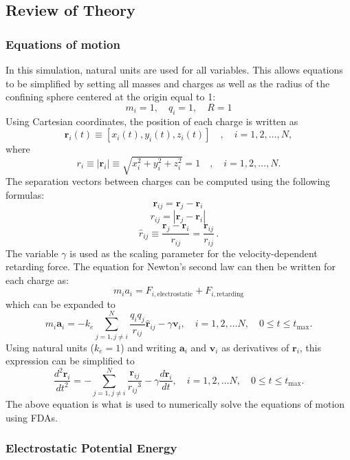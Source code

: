 \documentclass[10pt]{article}
\begin{document}
\subsection*{Review of Theory}

\subsubsection*{Equations of motion}

In this simulation, natural units are used for all variables. This allows equations to be simplified by
setting all masses and charges as well as the radius of the confining sphere centered at the origin
equal to 1: 
$$m_i = 1, \quad q_i = 1, \quad R = 1$$
Using Cartesian coordinates, the position of each charge is written as 
$$\mathbf{r}_i(t) \equiv [x_i(t), y_i(t), z_i(t)] \quad , \quad i = 1, 2, \dots, N,$$
where
$$r_i \equiv |\mathbf{r}_i| \equiv \sqrt{x_i^2 + y_i^2 + z_i^2} = 1 \quad , \quad i = 1, 2, \dots, N.$$
The separation vectors between charges can be computed using the following formulas:
$$\mathbf{r}_{ij} = \mathbf{r}_j - \mathbf{r}_i \,$$
$$r_{ij} = |\mathbf{r}_j - \mathbf{r}_i| \,$$
$$\hat{r}_{ij} \equiv \frac{\mathbf{r}_j - \mathbf{r}_i}{r_{ij}} = \frac{\mathbf{r}_{ij}}{r_{ij}} \,.$$
The variable $\gamma$ is used as the scaling parameter for the velocity-dependent retarding force. The 
equation for Newton's second law can then be written for each charge as:
$$m_i a_i = F_{i, \textrm{electrostatic}} + F_{i, \textrm{retarding}}$$
which can be expanded to 
$$m_i \mathbf{a}_i=-k_e \sum_{j=1, j \neq i}^N \frac{q_i q_j}{r_{i j}} 
\hat{\mathbf{r}}_{i j}-\gamma \mathbf{v}_i, \quad i=1,2, \ldots N, \quad 0 \leq t \leq t_{\max }.$$
Using natural units ($k_e=1$) and writing $\mathbf{a}_i$ and $\mathbf{v}_i$ as derivatives of 
$\mathbf{r}_i$, this expression can be simplified to 
\begin{equation}\label{EOM}
\frac{d^2 \mathbf{r}_i}{d t^2}=-\sum_{j=1, j \neq i}^N \frac{\mathbf{r}_{i j}}{r_{i j}{ }^3}-\gamma 
\frac{d \mathbf{r}_i}{d t}, \quad i=1,2, \ldots N, \quad 0 \leq t \leq t_{\max }.
\end{equation}
The above equation is what is used to numerically solve the equations of motion using FDAs. 

\subsubsection*{Electrostatic Potential Energy}
\end{document}
